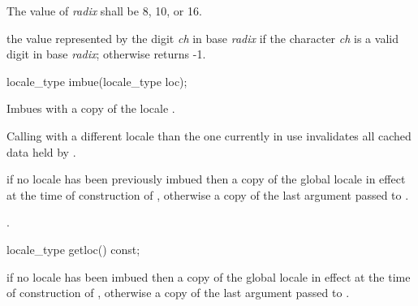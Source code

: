 \begin{itemdescr}
\pnum
\precondition  The value of \textit{radix} shall be 8, 10, or 16.

\pnum
\returns  the value represented by the digit \textit{ch} in base
\textit{radix} if the character \textit{ch} is a valid digit in base
\textit{radix}; otherwise returns -1.
\end{itemdescr}

%
%
\begin{itemdecl}
locale_type imbue(locale_type loc); 
\end{itemdecl}

\begin{itemdescr}
\pnum
\effects  Imbues  with a copy of the
locale . \begin{note} Calling  with a
different locale than the one currently in use invalidates all cached
data held by . \end{note}

\pnum
\returns  if no locale has been previously imbued then a copy of the
global locale in effect at the time of construction of ,
otherwise a copy of the last argument passed to .

\pnum
\postcondition  {}.
\end{itemdescr}

%
%
\begin{itemdecl}
locale_type getloc() const;
\end{itemdecl}

\begin{itemdescr}
\pnum
\returns  if no locale has been imbued then a copy of the global locale
in effect at the time of construction of , otherwise a copy of
the last argument passed to .
\end{itemdescr}


